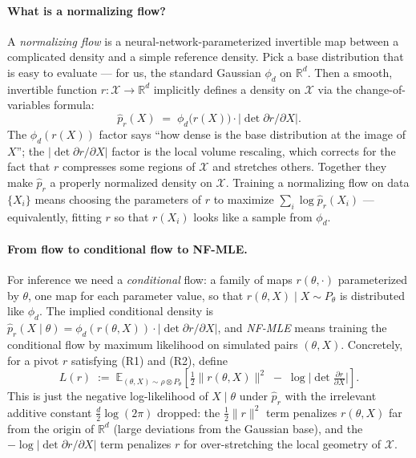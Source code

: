 \documentclass[11pt]{article}
\begin{document}
\paragraph{What is a normalizing flow?}
A \emph{normalizing flow} \citep[overview:][]{PapamakariosEtAl2021} is a
neural-network-parameterized invertible map between a complicated
density and a simple reference density. Pick a base distribution that is
easy to evaluate --- for us, the standard Gaussian \(\phi_d\) on
\(\mathbb{R}^d\). Then a smooth, invertible function
\(r: \mathcal{X} \to \mathbb{R}^d\) implicitly defines a density on
\(\mathcal{X}\) via the change-of-variables formula:
\[
\hat p_r(X) \;=\; \phi_d\bigl(r(X)\bigr) \cdot \bigl|\det \partial r / \partial X\bigr|.
\]
The \(\phi_d(r(X))\) factor says ``how dense is the base distribution
at the image of \(X\)''; the \(|\det \partial r / \partial X|\) factor
is the local volume rescaling, which corrects for the fact that
\(r\) compresses some regions of \(\mathcal{X}\) and stretches others.
Together they make \(\hat p_r\) a properly normalized density on
\(\mathcal{X}\). Training a normalizing flow on data
\(\{X_i\}\) means choosing the parameters of \(r\) to maximize
\(\sum_i \log \hat p_r(X_i)\) --- equivalently, fitting \(r\) so that
\(r(X_i)\) looks like a sample from \(\phi_d\).

\paragraph{From flow to conditional flow to NF-MLE.}
For inference we need a \emph{conditional} flow: a family of maps
\(r(\theta, \cdot)\) parameterized by \(\theta\), one map for each
parameter value, so that
\(r(\theta, X) \mid X \sim P_\theta\) is distributed like \(\phi_d\).
The implied conditional density is
\(\hat p_r(X \mid \theta) = \phi_d(r(\theta, X)) \cdot |\det \partial r / \partial X|\),
and \emph{NF-MLE} means training the conditional flow by maximum
likelihood on simulated pairs \((\theta, X)\). Concretely, for a pivot
\(r\) satisfying (R1) and (R2), define
\[
\boxed{\;L(r) \;:=\; \mathbb{E}_{(\theta, X) \sim \rho \otimes P_\theta}\!\left[ \tfrac{1}{2}\|r(\theta, X)\|^2 \;-\; \log\bigl|\det \tfrac{\partial r}{\partial X}\bigr| \right].\;}
\]
This is just the negative log-likelihood of \(X \mid \theta\) under
\(\hat p_r\) with the irrelevant additive constant
\(\tfrac{d}{2}\log(2\pi)\) dropped: the \(\tfrac{1}{2}\|r\|^2\) term
penalizes \(r(\theta, X)\) far from the origin of \(\mathbb{R}^d\) (large
deviations from the Gaussian base), and the \(-\log|\det \partial r/\partial X|\)
term penalizes \(r\) for over-stretching the local geometry of
\(\mathcal{X}\).
\end{document}
